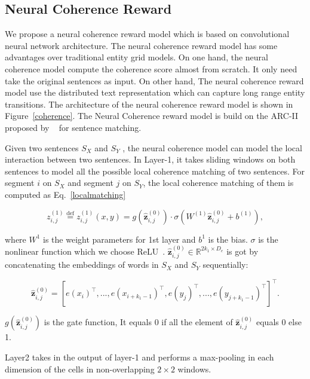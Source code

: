 \documentclass[letterpaper]{article} %
\begin{document}
	\label{RL}
	\subsection{Neural Coherence Reward}
	\label{ncr}
	We propose a neural coherence reward model which is based on convolutional neural network architecture.  The neural coherence reward model has some advantages over traditional entity grid models. On one hand, the neural coherence model compute the coherence score almost from scratch. It only need take the original sentences as input. On other hand,  The neural coherence reward model use the distributed text representation which can capture long range entity transitions. The architecture of the neural coherence reward model is shown in Figure~\ref{coherence}. The Neural Coherence reward model is build on the ARC-II proposed by ~\cite{NIPS2014_hu} for sentence matching.

	
	Given two sentences $S_X$ and $S_Y$ , the neural coherence model can model the local interaction between two sentences. In Layer-1, it takes sliding windows on both sentences to model all the possible local coherence matching of two sentences. For segment $i$ on $S_X$ and segment $j$ on $S_Y$, the local coherence matching of them is computed as Eq.~\ref{localmatching}
	
	\begin{equation}
	z^{(1)}_{i,j} \overset{\text{def}}{=}
	z^{(1)}_{i,j}(x,y) =  g(\hat{\mathbf{z}}^{(0)}_{i,j})\cdot \sigma(W^{(1)} \hat{\mathbf{z}}^{(0)}_{i,j} + b^{(1)}),
	\label{localmatching}
	\end{equation}
	
	where $W^1$ is the weight parameters for 1st layer and $b^1$ is the bias. $\sigma$ is the nonlinear function which we choose ReLU~\cite{relu}. $\hat{\mathbf{z}}^{(0)}_{i,j} \in \mathbb{R}^{2k_1 \times D_{e}}$ is got by concatenating the embeddings of words in $S_X$ and $S_Y$ sequentially:
	
	\begin{equation}
	\hat{\mathbf{z}}^{(0)}_{i,j} =  [e(x_i)^\top, ... , e(x_{i+k_1-1})^\top, e(y_j)^\top,..., e(y_{j+k_1-1})^\top]^\top.
	\end{equation}
	
	\noindent $g(\hat{\mathbf{z}}^{(0)}_{i,j})$ is the gate function, It equals 0 if all the element of $\hat{\mathbf{z}}^{(0)}_{i,j}$ equals 0 else 1.
	
	Layer2 takes in the output of layer-1 and performs a max-pooling in each dimension of the cells in non-overlapping $2\times 2$ windows.
	
\end{document}
